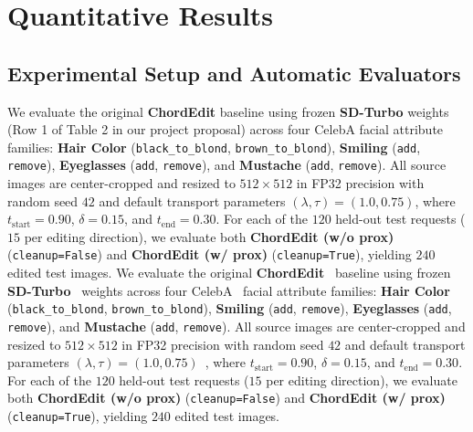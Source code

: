 \documentclass[11pt,a4paper]{article}
\begin{document}
\section{Quantitative Results}

\subsection{Experimental Setup and Automatic Evaluators}
We evaluate the original \textbf{ChordEdit} baseline using frozen \textbf{SD-Turbo} weights (Row 1 of Table 2 in our project proposal) across four CelebA facial attribute families: \textbf{Hair Color} (\texttt{black\_to\_blond}, \texttt{brown\_to\_blond}), \textbf{Smiling} (\texttt{add}, \texttt{remove}), \textbf{Eyeglasses} (\texttt{add}, \texttt{remove}), and \textbf{Mustache} (\texttt{add}, \texttt{remove}). All source images are center-cropped and resized to $512 \times 512$ in FP32 precision with random seed $42$ and default transport parameters $(\lambda, \tau) = (1.0, 0.75)$, where $t_{\text{start}} = 0.90$, $\delta = 0.15$, and $t_{\text{end}} = 0.30$. For each of the $120$ held-out test requests ($15$ per editing direction), we evaluate both \textbf{ChordEdit (w/o prox)} (\texttt{cleanup=False}) and \textbf{ChordEdit (w/ prox)} (\texttt{cleanup=True}), yielding $240$ edited test images.
We evaluate the original \textbf{ChordEdit}~\cite{lu2026chordedit,chordedit_repo} baseline using frozen \textbf{SD-Turbo}~\cite{sdturbo} weights across four CelebA~\cite{liu2015celeba,celeba_web} facial attribute families: \textbf{Hair Color} (\texttt{black\_to\_blond}, \texttt{brown\_to\_blond}), \textbf{Smiling} (\texttt{add}, \texttt{remove}), \textbf{Eyeglasses} (\texttt{add}, \texttt{remove}), and \textbf{Mustache} (\texttt{add}, \texttt{remove}). All source images are center-cropped and resized to $512 \times 512$ in FP32 precision with random seed $42$ and default transport parameters $(\lambda, \tau) = (1.0, 0.75)$~\cite{lu2026chordedit,li2026rethinking}, where $t_{\text{start}} = 0.90$, $\delta = 0.15$, and $t_{\text{end}} = 0.30$. For each of the $120$ held-out test requests ($15$ per editing direction), we evaluate both \textbf{ChordEdit (w/o prox)} (\texttt{cleanup=False}) and \textbf{ChordEdit (w/ prox)} (\texttt{cleanup=True}), yielding $240$ edited test images.
\end{document}
